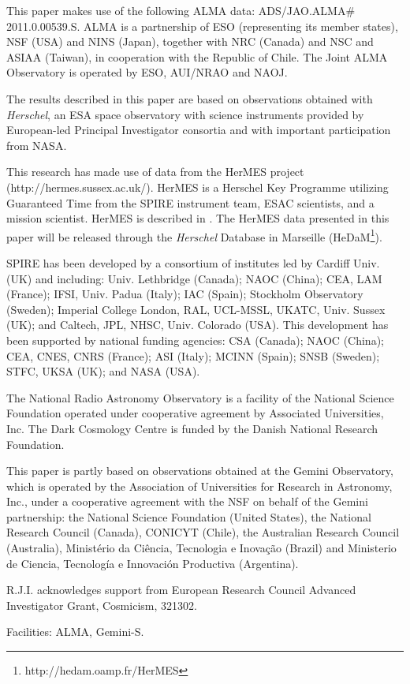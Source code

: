 \documentclass[iop]{emulateapj}
\begin{document}
\begin{acknowledgments}

This paper makes use of the following ALMA data: ADS/JAO.ALMA\# 2011.0.00539.S.
ALMA is a partnership of ESO (representing its member states), NSF (USA) and
NINS (Japan), together with NRC (Canada) and NSC and ASIAA (Taiwan), in
cooperation with the Republic of Chile. The Joint ALMA Observatory is operated
by ESO, AUI/NRAO and NAOJ.

The results described in this paper are based on observations obtained with
{\it Herschel}, an ESA space observatory with science instruments provided by
European-led Principal Investigator consortia and with important participation
from NASA.  

This research has made use of data from the HerMES project
(http://hermes.sussex.ac.uk/). HerMES is a Herschel Key Programme utilizing
Guaranteed Time from the SPIRE instrument team, ESAC scientists, and a mission
scientist. HerMES is described in \citet{Oliver:2012lr}.  The HerMES data
presented in this paper will be released through the {\em Herschel} Database in
Marseille (HeDaM\footnote{http://hedam.oamp.fr/HerMES}).

SPIRE has been developed by a consortium of institutes led by Cardiff Univ.
(UK) and including: Univ. Lethbridge (Canada); NAOC (China); CEA, LAM (France);
IFSI, Univ. Padua (Italy); IAC (Spain); Stockholm Observatory (Sweden);
Imperial College London, RAL, UCL-MSSL, UKATC, Univ. Sussex (UK); and Caltech,
JPL, NHSC, Univ. Colorado (USA). This development has been supported by
national funding agencies: CSA (Canada); NAOC (China); CEA, CNES, CNRS
(France); ASI (Italy); MCINN (Spain); SNSB (Sweden); STFC, UKSA (UK); and NASA
(USA).

The National Radio Astronomy Observatory is a facility of the National Science
Foundation operated under cooperative agreement by Associated Universities,
Inc.  The Dark Cosmology Centre is funded by the Danish National Research
Foundation.

This paper is partly based on observations obtained at the Gemini Observatory,
which is operated by the Association of Universities for Research in Astronomy,
Inc., under a cooperative agreement with the NSF on behalf of the Gemini
partnership: the National Science Foundation (United States), the National
Research Council (Canada), CONICYT (Chile), the Australian Research Council
(Australia), Minist\'erio da Ci\^encia, Tecnologia e Inova\c{c}\~ao (Brazil)
and Ministerio de Ciencia, Tecnolog\'ia e Innovaci\'on Productiva (Argentina).  

R.J.I. acknowledges support from European Research Council Advanced
Investigator Grant, Cosmicism, 321302.

Facilities: ALMA, Gemini-S.

\end{acknowledgments}
\end{document}
